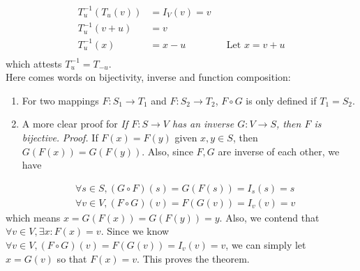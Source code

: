 \documentclass[11pt]{article}
\begin{document}
$$\begin{aligned}
T_u^{-1}(T_u(v))&=I_V(v)=v\\
T_u^{-1}(v+u)&=v\\
T_u^{-1}(x)&=x-u && \text{Let } x=v+u\\
\end{aligned}$$
which attests \(T_{u}^{-1}=T_{-u}\).\\
Here comes words on bijectivity, inverse and function composition:\\
\begin{enumerate}
\item For two mappings \(F:S_1\rightarrow T_1\) and \(F:S_2\rightarrow T_2\), \(F\circ G\) is only defined if \(T_1=S_2\).\\
\item A more clear proof for \emph{If \(F:S\rightarrow V\) has an inverse \(G:V\rightarrow S\), then \(F\) is bijective.} \emph{Proof.} If \(F(x)=F(y)\) given \(x,y\in S\), then \(G(F(x))=G(F(y))\). Also, since \(F,G\) are inverse of each other, we have
\end{enumerate}
$$\begin{aligned}
&\forall s\in S, (G\circ F)(s)=G(F(s))=I_s(s)=s\\
&\forall v\in V, (F\circ G)(v)=F(G(v))=I_v(v)=v
\end{aligned}$$
which means \(x=G(F(x))=G(F(y))=y\). Also, we contend that \(\forall v\in V, \exists x: F(x)=v\). Since we know \(\forall v\in V, (F\circ G)(v)=F(G(v))=I_v(v)=v\), we can simply let \(x=G(v)\) so that \(F(x)=v\). This proves the theorem.
\end{document}
